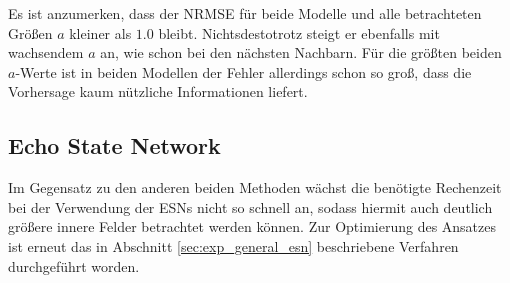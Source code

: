 Es ist anzumerken, dass der NRMSE für beide Modelle und alle betrachteten Größen $a$ kleiner als $1.0$ bleibt. Nichtsdestotrotz steigt er ebenfalls mit wachsendem $a$ an, wie schon bei den nächsten Nachbarn. Für die größten beiden $a$-Werte ist in beiden Modellen der Fehler allerdings schon so groß, dass die Vorhersage kaum nützliche Informationen liefert.

\subsection{Echo State Network}
Im Gegensatz zu den anderen beiden Methoden wächst die benötigte Rechenzeit bei der Verwendung der \textsc{ESN}s nicht so schnell an, sodass hiermit auch deutlich größere innere Felder betrachtet werden können. Zur Optimierung des Ansatzes ist erneut das in Abschnitt \ref{sec:exp_general_esn} beschriebene Verfahren durchgeführt worden.

